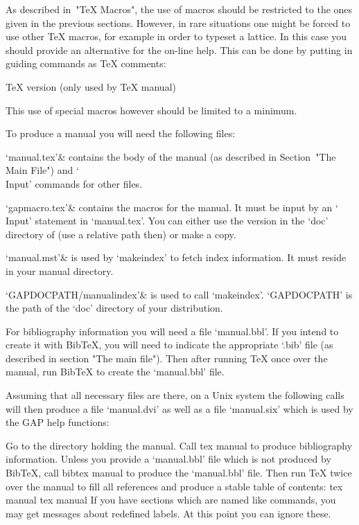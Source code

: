 As  described in~"TeX Macros", the use of  macros should be restricted to
the ones given in the previous sections.  However, in rare situations one
might be forced to use other {\TeX} macros,
for example  in order  to  typeset a lattice.
In this case you should provide an alternative for the on-line help.
This can be done by putting in guiding commands as {\TeX} comments:

\begintt
TeX version (only used by TeX manual)
\endtt

This use of special macros however should be limited to a minimum.


To produce a manual you will need the following files:

\beginitems
`manual.tex'&
    contains the body of the manual
    (as described in Section~"The Main File")
    and `\\Input' commands for other files.

`gapmacro.tex'&
    contains the macros for the manual.
    It must be input by an `\\Input' statement in `manual.tex'.
    You can either use the version in the `doc' directory of {\GAP}
    (use a relative path then) or make a copy.

`manual.mst'&
    is used by `makeindex' to fetch index information.
    It must reside in your manual directory.

`GAPDOCPATH/manualindex'&
    is used to call `makeindex'.
    `GAPDOCPATH' is the path of the `doc' directory of your {\GAP}
    distribution.
\enditems

For bibliography information you will need a file `manual.bbl'. If you
intend to create it with Bib{\TeX}, you will need to indicate the
appropriate `.bib' file (as described in section "The main file"). Then
after running {\TeX} once over the manual, run Bib{\TeX} to create the
`manual.bbl' file.

Assuming that all necessary files are there,
on a Unix system the following calls will then produce a file `manual.dvi'
as well as a file `manual.six' which is used by the GAP help functions:

Go to the directory holding the manual. Call
\begintt
tex manual
\endtt
to produce bibliography information. Unless you provide a `manual.bbl' file
which is not produced by Bib{\TeX}, call
\begintt
bibtex manual
\endtt
to produce the `manual.bbl' file. Then run {\TeX} twice over the manual to
fill all references and produce a stable table of contents:
\begintt
tex manual
tex manual
\endtt
If you have sections which are named like commands, you may get messages
about redefined labels. At this point you can ignore these.

